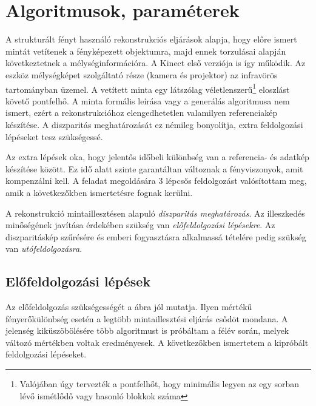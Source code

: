 \chapter{Algoritmusok, paraméterek}\label{sect:AlgPar}

A strukturált fényt használó rekonstrukciós eljárások alapja, hogy előre ismert mintát vetítenek a fényképezett objektumra, majd ennek torzulásai alapján következtetnek a mélységinformációra.
A Kinect első verziója is így működik.
Az eszköz mélységképet szolgáltató része (kamera és projektor) az infravörös tartományban üzemel.
A vetített minta egy látszólag véletlenszerű\footnote{Valójában úgy tervezték a pontfelhőt, hogy minimális legyen az egy sorban lévő ismétlődő vagy hasonló blokkok száma} eloszlást követő pontfelhő.
A minta formális leírása vagy a generálás algoritmusa nem ismert, ezért a rekonstrukcióhoz elengedhetetlen valamilyen referenciakép készítése.
A diszparitás meghatározását ez némileg bonyolítja, extra feldolgozási lépéseket tesz szükségessé.

Az extra lépések oka, hogy jelentős időbeli különbség van a referencia- és adatkép készítése között.
Ez idő alatt szinte garantáltan változnak a fényviszonyok, amit kompenzálni kell.
A feladat megoldására 3 lépcsős feldolgozást valósítottam meg, amik a következőkben ismertetésre fognak kerülni.

A rekonstrukció mintaillesztésen alapuló \emph{diszparitás meghatározás}.
Az illeszkedés minőségének javítása érdekében szükség van \emph{előfeldolgozási lépésekre}.
Az diszparitáskép szűrésére és emberi fogyasztásra alkalmassá tételére pedig szükség van \emph{utófeldolgozásra}.

\section{Előfeldolgozási lépések}\label{sect:Preproc}

Az előfeldolgozás szükségességét a  ábra jól mutatja.
Ilyen mértékű fényerőkülönbség esetén a legtöbb mintaillesztési eljárás csődöt mondana.
A jelenség kiküszöbölésére több algoritmust is próbáltam a félév során, melyek változó mértékben voltak eredményesek.
A következőkben ismertetem a kipróbált feldolgozási lépéseket.


